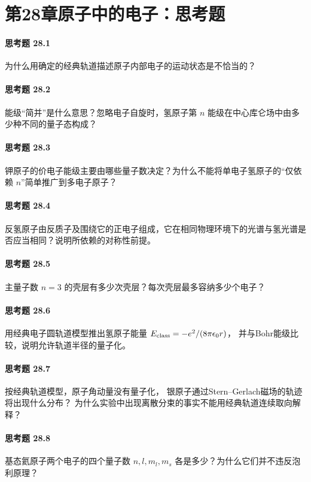 \section*{第28章\quad 原子中的电子：思考题}
\paragraph{思考题 28.1}
为什么用确定的经典轨道描述原子内部电子的运动状态是不恰当的？
\paragraph{思考题 28.2}
能级“简并”是什么意思？忽略电子自旋时，氢原子第 \(n\) 能级在中心库仑场中由多少种不同的量子态构成？
\paragraph{思考题 28.3}
钾原子的价电子能级主要由哪些量子数决定？为什么不能将单电子氢原子的“仅依赖 \(n\)”简单推广到多电子原子？
\paragraph{思考题 28.4}
反氢原子由反质子及围绕它的正电子组成，它在相同物理环境下的光谱与氢光谱是否应当相同？说明所依赖的对称性前提。
\paragraph{思考题 28.5}
主量子数 \(n=3\) 的壳层有多少次壳层？每次壳层最多容纳多少个电子？
\paragraph{思考题 28.6}
用经典电子圆轨道模型推出氢原子能量
\(E_{\rm class}=-e^2/(8\pi\epsilon_0r)\)，
并与Bohr能级比较，说明允许轨道半径的量子化。
\paragraph{思考题 28.7}
按经典轨道模型，原子角动量没有量子化，
银原子通过Stern--Gerlach磁场的轨迹将出现什么分布？
为什么实验中出现离散分束的事实不能用经典轨道连续取向解释？
\paragraph{思考题 28.8}
基态氦原子两个电子的四个量子数
\(n,l,m_l,m_s\) 各是多少？为什么它们并不违反泡利原理？
